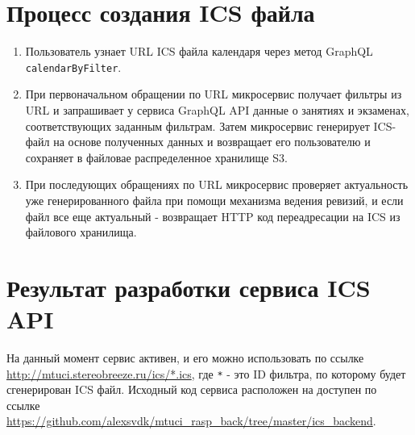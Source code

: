 \section{Процесс создания ICS файла}
\begin{enumerate}
\item Пользователь узнает URL ICS файла календаря через метод GraphQL \texttt{calendarByFilter}.
\item При первоначальном обращении по URL микросервис получает фильтры из URL и запрашивает у сервиса 
GraphQL API данные о занятиях и экзаменах, соответствующих заданным фильтрам. 
Затем микросервис генерирует ICS-файл на основе полученных данных и возвращает 
его пользователю и сохраняет в файловае распределенное хранилище S3.
\item При последующих обращениях по URL микросервис проверяет актуальность уже 
генерированного файла при помощи механизма ведения ревизий, и если файл все 
еще актуальный - возвращает HTTP код переадресации на ICS из файлового хранилища.
\end{enumerate}

\section{Результат разработки сервиса ICS API}
На данный момент сервис активен, и его можно использовать по ссылке \url{http://mtuci.stereobreeze.ru/ics/*.ics}, 
где \texttt{*} - это ID фильтра, по которому будет сгенерирован ICS файл.
Исходный код сервиса расположен на доступен по ссылке \url{https://github.com/alexsvdk/mtuci_rasp_back/tree/master/ics_backend}.
